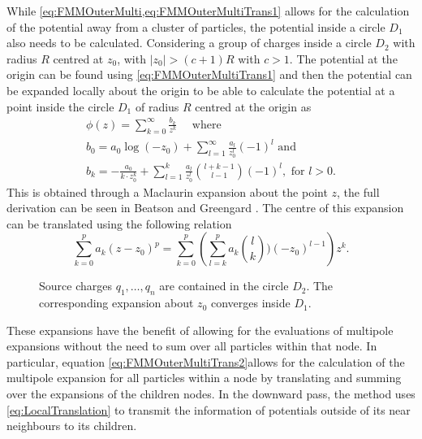 While \cref{eq:FMMOuterMulti,eq:FMMOuterMultiTrans1} allows for the calculation of the potential away from a cluster of particles, the potential inside a circle $D_1$ also needs to be calculated. Considering a group of charges inside a circle $D_2$ with radius $R$ centred at $z_0$, with $|z_0|>(c+1)R$ with $c>1$. The potential at the origin can be found using \cref{eq:FMMOuterMultiTrans1} and then the potential can be expanded locally about the origin to be able to calculate the potential at a point inside the circle $D_1$ of radius $R$ centred at the origin as
\begin{equation}
\label{eq:FMMInner}
\begin{gathered}
    \phi(z) = \sum_{k=0}^\infty \frac{b_k}{z^k} \quad \text{ where } \\
    b_0 = a_0\log(-z_0) + \sum_{l=1}^\infty \frac{a_l}{z_0^l}(-1)^l \text{ and } \\
    b_k = -\frac{a_0}{k\cdot z_0^k} + \sum_{l=1}^{k} \frac{a_l}{z_0^{l}} \binom{l+k-1}{l-1}(-1)^l, \text{ for } l>0.
\end{gathered}
\end{equation}
This is obtained through a Maclaurin expansion about the point $z$, the full derivation can be seen in Beatson and Greengard \cite{Beatson}. The centre of this expansion can be translated using the following relation
\begin{equation}
    \label{eq:LocalTranslation}
    \sum_{k=0}^p a_k(z-z_0)^p = \sum_{k=0}^{p} \left( \sum_{l=k}^p a_k \binom{l}{k})(-z_0)^{l-1} \right)z^k.
\end{equation}

\begin{figure}
    \centering
        \resizebox{.5\linewidth}{!}{}
    \caption{Source charges $q_1,\dots,q_n$ are contained in the circle $D_2$. The corresponding expansion about $z_0$ converges inside $D_1$.}
    \label{fig:Translation}
\end{figure}

These expansions have the benefit of allowing for the evaluations of multipole expansions without the need to sum over all particles within that node. In particular, equation \ref{eq:FMMOuterMultiTrans2}allows for the calculation of the multipole expansion for all particles within a node by translating and summing over the expansions of the children nodes. In the downward pass, the method uses \cref{eq:LocalTranslation} to transmit the information of potentials outside of its near neighbours to its children.

